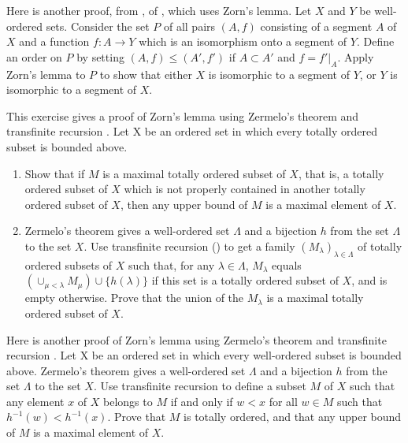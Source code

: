 \documentclass{article}
\begin{document}
\begin{exercise}
  \label{exe:vgms7ihx}
  Here is another proof, from \textcite[\S2.5,
  Theorem~3]{bib:lmhdqwpw}, of , which uses Zorn's
  lemma.  Let \(X\) and \(Y\) be well-ordered sets.  Consider the set
  \(P\) of all pairs \((A,f)\) consisting of a segment \(A\) of \(X\)
  and a function \(f : A \to Y\) which is an isomorphism onto a
  segment of \(Y\).  Define an order on \(P\) by setting
  \((A,f) \leq (A',f')\) if \(A \subset A'\) and \(f = f' \vert_A\).
  Apply Zorn's lemma to \(P\) to show that either \(X\) is isomorphic
  to a segment of \(Y\), or \(Y\) is isomorphic to a segment of \(X\).
\end{exercise}

\begin{exercise}
  \label{exe:9d868h6m}
  This exercise gives a proof of Zorn's lemma using Zermelo's theorem
  and transfinite recursion \parencite[Chapter~II,
  Theorem~9.4]{bib:h8xsxpp7}.  Let X be an ordered set in which every
  totally ordered subset is bounded above.
  \begin{enumerate}
  \item \label{item:ebwyq3lr} Show that if \(M\) is a maximal totally
    ordered subset of \(X\), that is, a totally ordered subset of
    \(X\) which is not properly contained in another totally ordered
    subset of \(X\), then any upper bound of \(M\) is a maximal
    element of \(X\).
  \item Zermelo's theorem gives a well-ordered set \(\Lambda\) and a
    bijection \(h\) from the set \(\Lambda\) to the set \(X\).  Use
    transfinite recursion () to get a family
    \((M_\lambda)_{\lambda \in \Lambda}\) of totally ordered subsets
    of \(X\) such that, for any \(\lambda \in \Lambda\), \(M_\lambda\)
    equals \((\cup_{\mu < \lambda} M_\mu) \cup \{ h(\lambda) \}\) if
    this set is a totally ordered subset of \(X\), and is empty
    otherwise.  Prove that the union of the \(M_\lambda\) is a maximal
    totally ordered subset of \(X\).
  \end{enumerate}
\end{exercise}

\begin{exercise}
  \label{exe:5qa65h5w}
  Here is another proof of Zorn's lemma using Zermelo's theorem and
  transfinite recursion \parencite[Part~II, Chapter~14,
  Solution~1]{bib:uw2wsr3k}.  Let X be an ordered set in which every
  well-ordered subset is bounded above.  Zermelo's theorem gives a
  well-ordered set \(\Lambda\) and a bijection \(h\) from the set
  \(\Lambda\) to the set \(X\).  Use transfinite recursion to define a
  subset \(M\) of \(X\) such that any element \(x\) of \(X\) belongs
  to \(M\) if and only if \(w < x\) for all \(w \in M\) such that
  \(h^{-1}(w) < h^{-1}(x)\).  Prove that \(M\) is totally ordered, and
  that any upper bound of \(M\) is a maximal element of \(X\).
\end{exercise}
\end{document}
